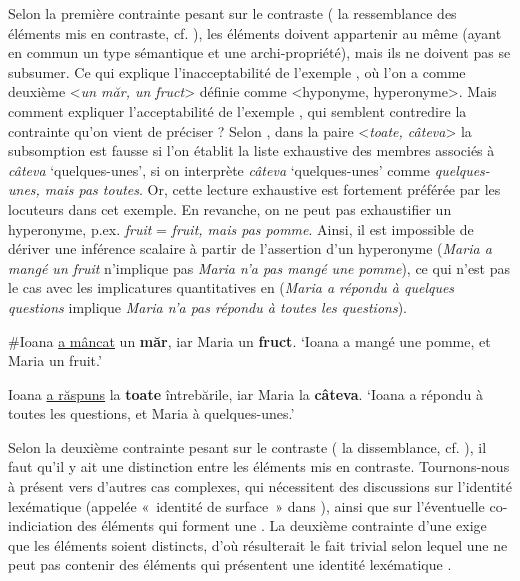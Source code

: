 Selon la première contrainte pesant sur le contraste ({\cad} la ressemblance des éléments mis en contraste, cf. \citealt{Umbach2005}), les éléments doivent appartenir au même  (ayant en commun un type sémantique et une archi-propriété), mais ils ne doivent pas se subsumer. Ce qui explique l’inacceptabilité de l’exemple , où l’on a comme deuxième  <\textit{un măr, un fruct}> définie comme <hyponyme, hyperonyme>. Mais comment expliquer l’acceptabilité de l’exemple , qui semblent contredire la contrainte qu’on vient de préciser ? Selon \citet{BilbiieEtAl2011}, dans la paire <\textit{toate, câteva}> la subsomption est fausse si l’on établit la liste exhaustive des membres associés à \textit{câteva} ‘quelques-unes’, {\cad} si on interprète \textit{câteva} ‘quelques-unes’ comme \textit{quelques-unes, mais pas toutes}. Or, cette lecture exhaustive est fortement préférée par les locuteurs dans cet exemple. En revanche, on ne peut pas exhaustifier un hyperonyme, p.ex. \textit{fruit} = \textit{fruit, mais pas pomme}. Ainsi, il est impossible de dériver une inférence scalaire à partir de l’assertion d’un hyperonyme (\textit{Maria a mangé un fruit} n’implique pas \textit{Maria n’a pas mangé une pomme}), ce qui n’est pas le cas avec les implicatures quantitatives en  (\textit{Maria a répondu à quelques questions} implique \textit{Maria n’a pas répondu à toutes les questions}).

\ea
\ea \#Ioana \uline{a mâncat} un \textbf{măr}, iar Maria un \textbf{fruct}. \label{ch2:ex151a}
\glt ‘Ioana a mangé une pomme, et Maria un fruit.’  

\ex Ioana \uline{a răspuns} la \textbf{toate} întrebările, iar Maria la \textbf{câteva}. \label{ch2:ex151b} 
\glt ‘Ioana a répondu à toutes les questions, et Maria à quelques-unes.’
\z
\z

Selon la deuxième contrainte pesant sur le contraste ({\cad} la dissemblance, cf. \citealt{Umbach2005}), il faut qu’il y ait une distinction entre les éléments mis en contraste. Tournons-nous à présent vers d’autres cas complexes, qui nécessitent des discussions sur l’identité lexématique (appelée «~identité de surface~» dans \citealt{HinterwimmerEtAl2008}), ainsi que sur l’éventuelle co-indiciation des éléments qui forment une . La deuxième contrainte d’une  exige que les éléments soient distincts, d’où résulterait le fait trivial selon lequel une  ne peut pas contenir des éléments qui présentent une identité lexématique . 


